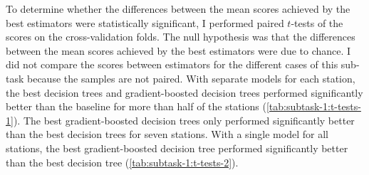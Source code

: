 \documentclass[11pt]{extarticle}
\begin{document}
To determine whether the differences between the mean scores achieved by the best
estimators were statistically significant, I performed paired $t$-tests of the scores
on the cross-validation folds.
The null hypothesis was that the differences between the mean scores achieved by the
best estimators were due to chance.
I did not compare the scores between estimators for the different cases of this
sub-task because the samples are not paired.
With separate models for each station, the best decision trees and gradient-boosted
decision trees performed significantly better than the baseline for more than half of
the stations (\cref{tab:subtask-1:t-tests-1}).
The best gradient-boosted decision trees only performed significantly better than the
best decision trees for seven stations.
With a single model for all stations, the best gradient-boosted decision tree performed
significantly better than the best decision tree (\cref{tab:subtask-1:t-tests-2}).
\end{document}
